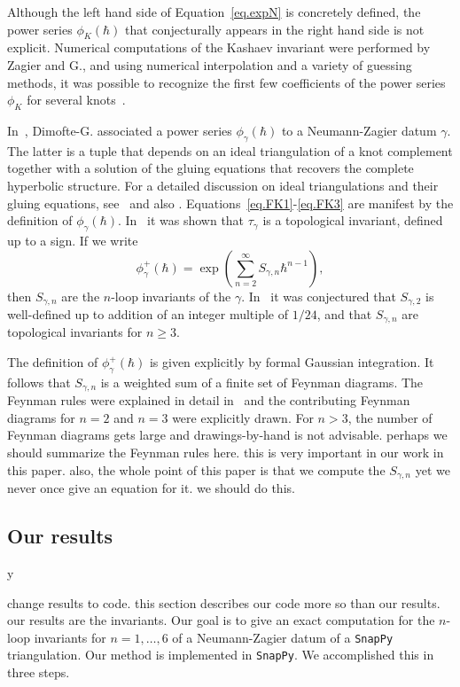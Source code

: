 \documentclass[12pt]{amsart}
\theoremstyle{definition}
\def\printname#1{
        \if\draft y
                \smash{\makebox[0pt]{\hspace{-0.5in}
                        \raisebox{8pt}{\tt\tiny #1}}}
        \fi
}
\def\lbl#1{\label{#1}\printname{#1}}
\def\ga{\gamma}
\begin{document}
Although the left hand side of Equation~\eqref{eq.expN} is concretely
defined, the power series $\phi_K(\hbar)$ that conjecturally appears in the 
right hand side is not explicit. Numerical computations of the Kashaev 
invariant were performed by Zagier and G., and using numerical 
interpolation and a variety of guessing methods, it was possible to recognize 
the first few coefficients of the power series $\phi_K$ for several 
knots~\cite{GZ1}.

In~\cite{DG}, Dimofte-G. associated a power series $\phi_{\gamma}(\hbar)$
to a Neumann-Zagier datum $\ga$. The latter is a tuple that depends on 
an ideal triangulation of a knot complement together with a solution
of the gluing equations that recovers the complete hyperbolic structure.
For a detailed discussion on ideal triangulations and their gluing equations,
see~\cite{Th,NZ} and also \cite[Sec.1.2]{DG}.
Equations~\eqref{eq.FK1}-\eqref{eq.FK3} are manifest by the definition of
$\phi_\gamma(\hbar)$. In~\cite{DG} it was shown that $\tau_\gamma$ is a 
topological invariant, defined up to a sign. If we write
$$
\phi^+_\gamma(\hbar)=\exp\left(\sum_{n=2}^\infty S_{\gamma,n}\hbar^{n-1}
\right),
$$
then $S_{\gamma,n}$ are the $n$-loop invariants of the $\ga$. In~\cite{DG}
it was conjectured that $S_{\gamma,2}$ is well-defined up to addition of
an integer multiple of $1/24$, and that $S_{\gamma,n}$ are topological
invariants for $n \geq 3$.
 
The definition of $\phi^+_\gamma(\hbar)$ is given explicitly by formal
Gaussian integration. It follows that $S_{\gamma,n}$ is a weighted sum
of a finite set of Feynman diagrams. The Feynman rules were explained in
detail in~\cite[Sec.1.6-1.8]{DG} and the contributing Feynman diagrams for
$n=2$ and $n=3$ were explicitly drawn. For $n>3$, the number of Feynman 
diagrams gets large and drawings-by-hand is not advisable. {\color{red}
perhaps we should summarize the Feynman rules here. this is very important
in our work in this paper. also, the whole point of this paper is that we compute
the $S_{\gamma, n}$ yet we never once give an equation for it. we should do this.}

\subsection{Our results}
\lbl{sub.results}

{\color{red} change results to code. this section
describes our code more so than our results. our results are the invariants.}
Our goal is to give an exact computation for the $n$-loop invariants
for $n=1,\dots,6$ of a Neumann-Zagier datum of a \texttt{SnapPy}
triangulation. Our method is implemented in \texttt{SnapPy}.
We accomplished this in three steps.
\end{document}
